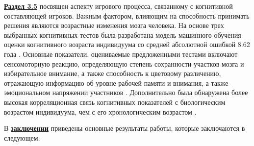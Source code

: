 \underline{\textbf{Раздел 3.5}} посвящен аспекту игрового процесса, связанному с когнитивной составляющей игроков. Важным фактором, влияющим на способность принимать решения являются возрастные изменения мозга человека. На основе трех выбранных когнитивных тестов была разработана модель машинного обучения оценки когнитивного возраста индивидуума со средней абсолютной ошибкой 8.62 года \cite{bib4}. Основные показатели, оцениваемые предложенными тестами включают сенсомоторную реакцию, определяющую степень сохранности участков мозга и избирательное внимание, а также способность к цветовому различению, отражающую информацию об уровне рабочей памяти и внимания, а также эмоциональном напряжении участников \cite{confbib2}. Дополнительно была обнаружена более высокая корреляционная связь когнитивных показателей с биологическим возрастом индивидуума, чем с его хронологическим возрастом \cite{confbib3}.


\FloatBarrier
{}                                  %
В \underline{\textbf{заключении}} приведены основные результаты работы, которые заключаются в следующем:



